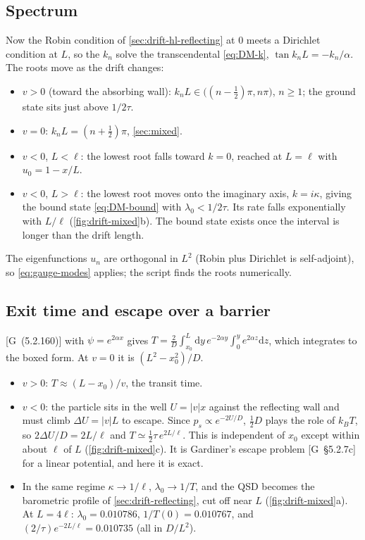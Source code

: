 \documentclass[11pt]{article}
\numberwithin{equation}{section}
\newcommand{\dd}{\mathrm{d}}
\newcommand{\G}[1]{[G~(#1)]}
\newcommand{\Gs}[1]{[G~\S#1]}
\begin{document}
\subsection{Spectrum}

Now the Robin condition of \cref{sec:drift-hl-reflecting} at $0$ meets a Dirichlet condition at $L$, so the $k_n$ solve the transcendental
\cref{eq:DM-k}, $\tan k_nL=-k_n/\alpha$. The roots move as the drift changes:
\begin{itemize}
  \item $v>0$ (toward the absorbing wall): $k_nL\in\bigl((n-\tfrac12)\pi,n\pi\bigr)$, $n\ge1$; the
        ground state sits just above $1/2\tau$.
  \item $v=0$: $k_nL=(n+\tfrac12)\pi$, \cref{sec:mixed}.
  \item $v<0$, $L<\ell$: the lowest root falls toward $k=0$, reached at $L=\ell$ with $u_0=1-x/L$.
  \item $v<0$, $L>\ell$: the lowest root moves onto the imaginary axis, $k=i\kappa$, giving the bound state
        \cref{eq:DM-bound} with $\lambda_0<1/2\tau$. Its rate falls exponentially with $L/\ell$
        (\cref{fig:drift-mixed}b). The bound state exists once the interval is longer than the drift length.
\end{itemize}
The eigenfunctions $u_n$ are orthogonal in $L^2$ (Robin plus Dirichlet is self-adjoint), so
\cref{eq:gauge-modes} applies; the script finds the roots numerically.

\subsection{Exit time and escape over a barrier}

\G{5.2.160} with $\psi=e^{2\alpha x}$ gives
$T=\frac2D\int_{x_0}^L\dd y\,e^{-2\alpha y}\int_0^ye^{2\alpha z}\dd z$, which integrates to the boxed form. At
$v=0$ it is $(L^2-x_0^2)/D$.
\begin{itemize}
  \item $v>0$: $T\approx(L-x_0)/v$, the transit time.
  \item $v<0$: the particle sits in the well $U=|v|x$ against the reflecting wall and must climb
        $\Delta U=|v|L$ to escape. Since $p_s\propto e^{-2U/D}$, $\tfrac12D$ plays the role of $k_BT$, so
        $2\Delta U/D=2L/\ell$ and $T\simeq\tfrac12\tau\,e^{2L/\ell}$. This is independent of $x_0$ except within
        about $\ell$ of $L$ (\cref{fig:drift-mixed}c). It is Gardiner's escape problem \Gs{5.2.7c} for a linear
        potential, and here it is exact.
  \item In the same regime $\kappa\to1/\ell$, $\lambda_0\to1/T$, and the QSD becomes the barometric
        profile of \cref{sec:drift-reflecting}, cut off near $L$ (\cref{fig:drift-mixed}a). At $L=4\ell$:
        $\lambda_0=0.010786$, $1/T(0)=0.010767$, and $(2/\tau)e^{-2L/\ell}=0.010735$ (all in $D/L^2$).
\end{itemize}
\end{document}
